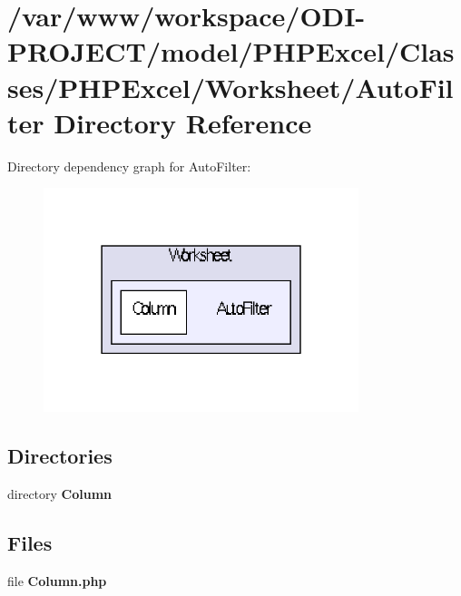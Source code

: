 \section{/var/www/workspace/\+O\+D\+I-\/\+P\+R\+O\+J\+E\+C\+T/model/\+P\+H\+P\+Excel/\+Classes/\+P\+H\+P\+Excel/\+Worksheet/\+Auto\+Filter Directory Reference}
\label{dir_8cf00c426837a0bb038927d106bcbfeb}
Directory dependency graph for Auto\+Filter\+:\nopagebreak
\begin{figure}[H]
\begin{center}
\leavevmode
\includegraphics[width=260pt]{dir_8cf00c426837a0bb038927d106bcbfeb_dep}
\end{center}
\end{figure}
\subsection*{Directories}
\begin{DoxyCompactItemize}
\item 
directory {\bf Column}
\end{DoxyCompactItemize}
\subsection*{Files}
\begin{DoxyCompactItemize}
\item 
file {\bfseries Column.\+php}
\end{DoxyCompactItemize}
